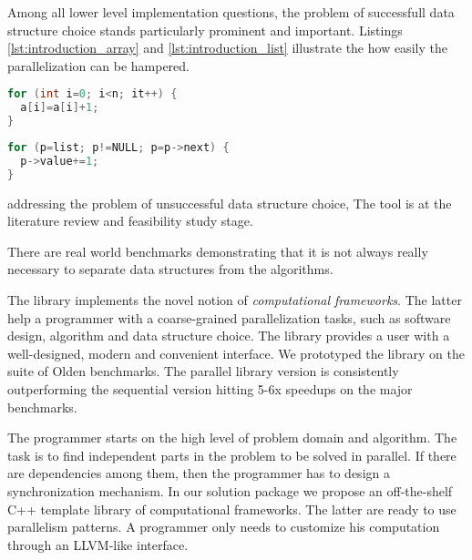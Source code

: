 
\quad Among all lower level implementation questions, the problem of successfull data structure choice stands particularly prominent and important. Listings \ref{lst:introduction_array} and \ref{lst:introduction_list} illustrate the how easily the parallelization can be hampered.
\begin{minipage}[t]{0.4\linewidth}
\begin{lstlisting}[caption={Parallelisable loop operating on a \textbf{linear array}.},label={lst:introduction_array},language=C]
for (int i=0; i<n; it++) {
  a[i]=a[i]+1;
}
\end{lstlisting}
\end{minipage}
%
\begin{minipage}[t]{0.6\linewidth}
\begin{lstlisting}[caption={Non-parallelisable loop operating on a \textbf{linked-list}.},label={lst:introduction_list},language=C]
for (p=list; p!=NULL; p=p->next) {
  p->value+=1;
}
\end{lstlisting}
\end{minipage}



addressing the problem of unsuccessful data structure choice,
 The tool is at the literature review and feasibility study stage.
 

There are real world benchmarks demonstrating that it is not always really necessary to separate data structures from the algorithms.

The library implements the novel notion of \textit{computational frameworks}. The latter help a programmer with a coarse-grained parallelization tasks, such as software design, algorithm and data structure choice. The library provides a user with a well-designed, modern and convenient interface. We prototyped the library on the suite of Olden benchmarks. The parallel library version is consistently outperforming the sequential version hitting 5-6x speedups on the major benchmarks.\newline\null

\quad The programmer starts on the high level of problem domain and algorithm. The task is to find independent parts in the problem to be solved in parallel. If there are dependencies among them, then the programmer has to design a synchronization mechanism. In our solution package we propose an off-the-shelf C++ template library of computational frameworks. The latter are ready to use parallelism patterns. A programmer only needs to customize his computation through an LLVM-like interface.


